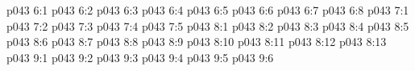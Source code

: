 \vs p043 6:1 
\vs p043 6:2 \pc 
\vs p043 6:3 
\vs p043 6:4 \pc 
\vs p043 6:5 
\vs p043 6:6 
\vs p043 6:7 
\vs p043 6:8 
\vs p043 7:1 
\vs p043 7:2 
\vs p043 7:3 
\vs p043 7:4 
\vs p043 7:5 
\vs p043 8:1 
\vs p043 8:2 
\vs p043 8:3 
\vs p043 8:4 
\vs p043 8:5 
\vs p043 8:6 
\vs p043 8:7 
\vs p043 8:8 
\vs p043 8:9 
\vs p043 8:10 
\vs p043 8:11 
\vs p043 8:12 \pc 
\vs p043 8:13 
\vs p043 9:1 
\vs p043 9:2 \pc 
\vs p043 9:3 
\vs p043 9:4 \pc 
\vs p043 9:5 
\vsetoff
\vs p043 9:6 
\quizlink
